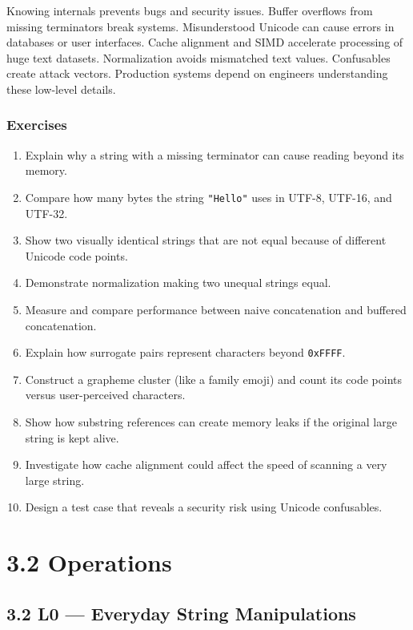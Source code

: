 \documentclass[
  letterpaper,
  DIV=11,
  numbers=noendperiod]{scrreprt}
\providecommand{\tightlist}{%
  \setlength{\itemsep}{0pt}\setlength{\parskip}{0pt}}
\begin{document}
Knowing internals prevents bugs and security issues. Buffer overflows
from missing terminators break systems. Misunderstood Unicode can cause
errors in databases or user interfaces. Cache alignment and SIMD
accelerate processing of huge text datasets. Normalization avoids
mismatched text values. Confusables create attack vectors. Production
systems depend on engineers understanding these low-level details.

\subsubsection{Exercises}\label{exercises-32}

\begin{enumerate}
\def\labelenumi{\arabic{enumi}.}
\tightlist
\item
  Explain why a string with a missing terminator can cause reading
  beyond its memory.
\item
  Compare how many bytes the string \texttt{"Hello"} uses in UTF-8,
  UTF-16, and UTF-32.
\item
  Show two visually identical strings that are not equal because of
  different Unicode code points.
\item
  Demonstrate normalization making two unequal strings equal.
\item
  Measure and compare performance between naive concatenation and
  buffered concatenation.
\item
  Explain how surrogate pairs represent characters beyond
  \texttt{0xFFFF}.
\item
  Construct a grapheme cluster (like a family emoji) and count its code
  points versus user-perceived characters.
\item
  Show how substring references can create memory leaks if the original
  large string is kept alive.
\item
  Investigate how cache alignment could affect the speed of scanning a
  very large string.
\item
  Design a test case that reveals a security risk using Unicode
  confusables.
\end{enumerate}

\section{3.2 Operations}\label{operations}

\subsection{3.2 L0 --- Everyday String
Manipulations}\label{l0-everyday-string-manipulations}
\end{document}
